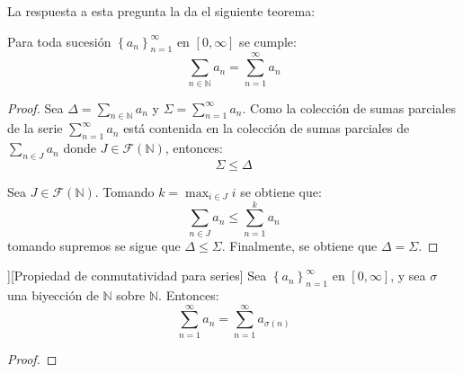 \documentclass[12pt]{report}
\theoremstyle{largebreak}
\begin{document}
    La respuesta a esta pregunta la da el siguiente teorema:

    \begin{theor}
        Para toda sucesión $\left\{a_n \right\}_{n=1}^\infty$ en $[0,\infty]$ se cumple:
        \begin{equation*}
            \sum_{n\in\mathbb{N}}a_n=\sum_{n=1}^{\infty}a_n
        \end{equation*}
    \end{theor}

    \begin{proof}
        Sea $\Delta=\sum_{n\in\mathbb{N}}a_n$ y $\Sigma=\sum_{n=1}^{\infty}a_n$. Como la colección de sumas parciales de la serie $\sum_{n=1}^{\infty}a_n$ está contenida en la colección de sumas parciales de $\sum_{n\in J }a_n$ donde $J\in \mathcal{F}(\mathbb{N})$, entonces:
        \begin{equation*}
            \Sigma\leq\Delta
        \end{equation*}
        
        Sea $J\in \mathcal{F}(\mathbb{N})$. Tomando $k=\max_{i\in J} i$ se obtiene que:
        \begin{equation*}
            \sum_{n\in J }a_n\leq\sum_{n=1 }^{k}a_n
        \end{equation*}
        tomando supremos se sigue que $\Delta\leq\Sigma$. Finalmente, se obtiene que $\Delta=\Sigma$.

    \end{proof}

    \begin{cor}][Propiedad de conmutatividad para series]
        Sea $\left\{a_n \right\}_{n=1}^\infty$ en $[0,\infty]$, y sea $\sigma$ una biyección de $\mathbb{N}$ sobre $\mathbb{N}$. Entonces:
        \begin{equation*}
            \sum_{n=1}^{\infty}a_n=\sum_{n=1}^{\infty}a_{\sigma(n) }
        \end{equation*}
    \end{cor}

    \begin{proof}
        
    \end{proof}
\end{document}
